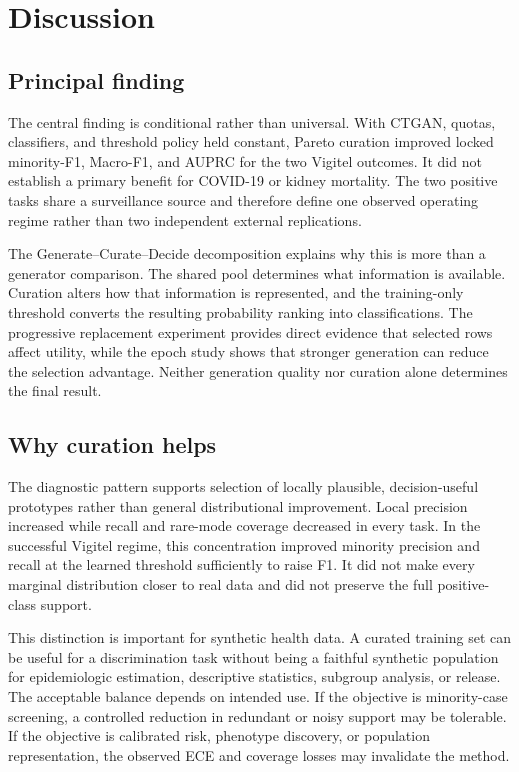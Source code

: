 \section{Discussion}
\label{sec:discussion}

\subsection{Principal finding}

The central finding is conditional rather than universal. With CTGAN, quotas, classifiers, and threshold policy held constant, Pareto curation improved locked minority-F1, Macro-F1, and AUPRC for the two Vigitel outcomes. It did not establish a primary benefit for COVID-19 or kidney mortality. The two positive tasks share a surveillance source and therefore define one observed operating regime rather than two independent external replications.

The Generate--Curate--Decide decomposition explains why this is more than a generator comparison. The shared pool determines what information is available. Curation alters how that information is represented, and the training-only threshold converts the resulting probability ranking into classifications. The progressive replacement experiment provides direct evidence that selected rows affect utility, while the epoch study shows that stronger generation can reduce the selection advantage. Neither generation quality nor curation alone determines the final result.

\subsection{Why curation helps}

The diagnostic pattern supports selection of locally plausible, decision-useful prototypes rather than general distributional improvement. Local precision increased while recall and rare-mode coverage decreased in every task. In the successful Vigitel regime, this concentration improved minority precision and recall at the learned threshold sufficiently to raise F1. It did not make every marginal distribution closer to real data and did not preserve the full positive-class support.

This distinction is important for synthetic health data. A curated training set can be useful for a discrimination task without being a faithful synthetic population for epidemiologic estimation, descriptive statistics, subgroup analysis, or release. The acceptable balance depends on intended use. If the objective is minority-case screening, a controlled reduction in redundant or noisy support may be tolerable. If the objective is calibrated risk, phenotype discovery, or population representation, the observed ECE and coverage losses may invalidate the method.

